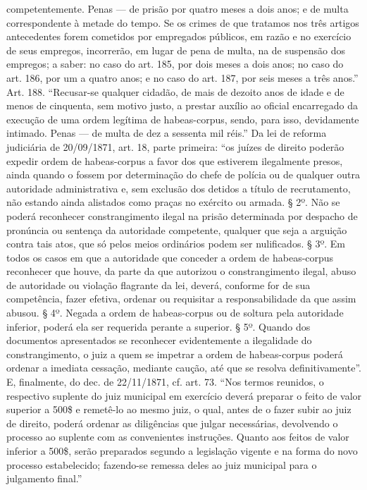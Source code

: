 {  competentemente. Penas --- de prisão por quatro meses a dois anos; e de
  multa correspondente à metade do tempo. Se os crimes de que tratamos
  nos três artigos antecedentes forem cometidos por empregados
  públicos, em razão e no exercício de seus empregos, incorrerão, em
  lugar de pena de multa, na de suspensão dos empregos; a saber: no caso
  do art. 185, por dois meses a dois anos; no caso do art. 186, por um a
  quatro anos; e no caso do art. 187, por seis meses a três anos.'' Art.
  188. ``Recusar-se qualquer cidadão, de mais de dezoito anos de idade e
  de menos de cinquenta, sem motivo justo, a prestar auxílio ao oficial
  encarregado da execução de uma ordem legítima de habeas-corpus, sendo,
  para isso, devidamente intimado. Penas --- de multa de dez a sessenta
  mil réis.'' Da lei de reforma judiciária de 20/09/1871, art. 18, parte
  primeira: ``os juízes de direito poderão expedir ordem de
  habeas-corpus a favor dos que estiverem ilegalmente presos, ainda
  quando o fossem por determinação do chefe de polícia ou de qualquer
  outra autoridade administrativa e, sem exclusão dos detidos a título
  de recrutamento, não estando ainda alistados como praças no exército
  ou armada. § 2º. Não se poderá reconhecer constrangimento ilegal na
  prisão determinada por despacho de pronúncia ou sentença da autoridade
  competente, qualquer que seja a arguição contra tais atos, que só
  pelos meios ordinários podem ser nulificados. § 3º. Em todos os casos
  em que a autoridade que conceder a ordem de habeas-corpus reconhecer
  que houve, da parte da que autorizou o constrangimento ilegal, abuso
  de autoridade ou violação flagrante da lei, deverá, conforme for de
  sua competência, fazer efetiva, ordenar ou requisitar a
  responsabilidade da que assim abusou. § 4º. Negada a ordem de
  habeas-corpus ou de soltura pela autoridade inferior, poderá ela ser
  requerida perante a superior. § 5º. Quando dos documentos apresentados
  se reconhecer evidentemente a ilegalidade do constrangimento, o juiz a
  quem se impetrar a ordem de habeas-corpus poderá ordenar a imediata
  cessação, mediante caução, até que se resolva definitivamente''. E,
  finalmente, do dec. de 22/11/1871, cf. art. 73. ``Nos termos reunidos,
  o respectivo suplente do juiz municipal em exercício deverá preparar o
  feito de valor superior a 500\$ e remetê-lo ao mesmo juiz, o qual,
  antes de o fazer subir ao juiz de direito, poderá ordenar as
  diligências que julgar necessárias, devolvendo o processo ao suplente
  com as convenientes instruções. Quanto aos feitos de valor inferior a
  500\$, serão preparados segundo a legislação vigente e na forma do
  novo processo estabelecido; fazendo-se remessa deles ao juiz municipal
  para o julgamento final.''}

